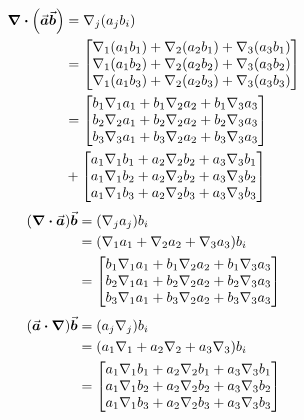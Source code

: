 \documentclass[dvipdfmx,autodetect-engine]{article}
\begin{document}
\begin{align}
    \div \pqty{\va*{a} \va*{b}}
    &= \nabla_j \pqty{a_j b_i}
    \\
    &= \mqty[
    \nabla_1 \pqty{a_1 b_1} + \nabla_2 \pqty{a_2 b_1} + \nabla_3 \pqty{a_3 b_1}  \\
    \nabla_1 \pqty{a_1 b_2} + \nabla_2 \pqty{a_2 b_2} + \nabla_3 \pqty{a_3 b_2}   \\
    \nabla_1 \pqty{a_1 b_3} + \nabla_2 \pqty{a_2 b_3} + \nabla_3 \pqty{a_3 b_3}  
    ]
    \\
    &= \mqty[
        b_1 \nabla_1 a_1 + b_1 \nabla_2 a_2 + b_1 \nabla_3 a_3 \\
        b_2 \nabla_2 a_1 + b_2 \nabla_2 a_2 + b_2 \nabla_3 a_3 \\
        b_3 \nabla_3 a_1 + b_3 \nabla_2 a_2 + b_3 \nabla_3 a_3 \\
    ] \\
    &+ \mqty[
        a_1 \nabla_1 b_1 + a_2 \nabla_2 b_2 + a_3 \nabla_3 b_1 \\
        a_1 \nabla_1 b_2 + a_2 \nabla_2 b_2 + a_3 \nabla_3 b_2 \\
        a_1 \nabla_1 b_3 + a_2 \nabla_2 b_3 + a_3 \nabla_3 b_3 \\
    ]
\end{align}
\begin{align}
    \pqty{ \div \va*{a}} \va*{b}
    &= \pqty{\nabla_j a_j} b_i \\
    &= \pqty{\nabla_1 a_1 + \nabla_2 a_2 + \nabla_3 a_3} b_i \\
    &= \mqty[
        b_1 \nabla_1 a_1 + b_1 \nabla_2 a_2 + b_1 \nabla_3 a_3 \\
        b_2 \nabla_1 a_1 + b_2 \nabla_2 a_2 + b_2 \nabla_3 a_3 \\
        b_3 \nabla_1 a_1 + b_3 \nabla_2 a_2 + b_3 \nabla_3 a_3 \\
    ]
\end{align}
\begin{align}
    \pqty{\va*{a} \vdot \grad} \va*{b}
    &= \pqty{a_j \nabla_j} b_i \\
    &= \pqty{a_1 \nabla_1 + a_2 \nabla_2 + a_3 \nabla_3} b_i \\
    &= \mqty[
        a_1 \nabla_1 b_1 + a_2 \nabla_2 b_1 + a_3 \nabla_3 b_1 \\
        a_1 \nabla_1 b_2 + a_2 \nabla_2 b_2 + a_3 \nabla_3 b_2 \\
        a_1 \nabla_1 b_3 + a_2 \nabla_2 b_3 + a_3 \nabla_3 b_3 \\
    ]
\end{align}
\end{document}
